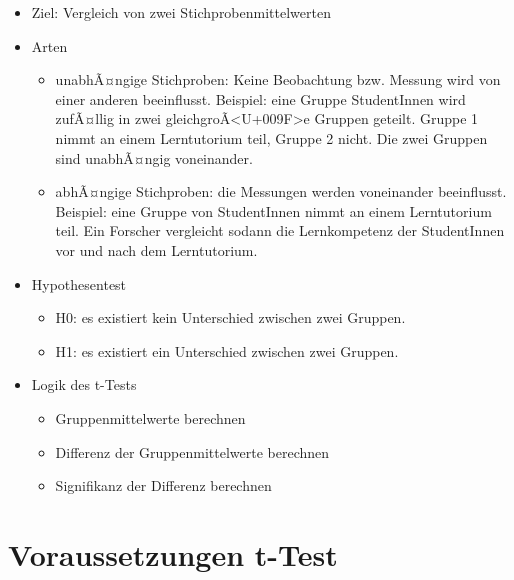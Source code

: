 \documentclass[
]{book}
\providecommand{\tightlist}{%
  \setlength{\itemsep}{0pt}\setlength{\parskip}{0pt}}
\begin{document}
\begin{itemize}
\tightlist
\item
  Ziel: Vergleich von zwei Stichprobenmittelwerten
\item
  Arten

  \begin{itemize}
  \tightlist
  \item
    unabhÃ¤ngige Stichproben: Keine Beobachtung bzw. Messung wird von einer anderen beeinflusst. Beispiel: eine Gruppe StudentInnen wird zufÃ¤llig in zwei gleichgroÃ\textless U+009F\textgreater e Gruppen geteilt. Gruppe 1 nimmt an einem Lerntutorium teil, Gruppe 2 nicht. Die zwei Gruppen sind unabhÃ¤ngig voneinander.
  \item
    abhÃ¤ngige Stichproben: die Messungen werden voneinander beeinflusst. Beispiel: eine Gruppe von StudentInnen nimmt an einem Lerntutorium teil. Ein Forscher vergleicht sodann die Lernkompetenz der StudentInnen vor und nach dem Lerntutorium.
  \end{itemize}
\item
  Hypothesentest

  \begin{itemize}
  \tightlist
  \item
    H0: es existiert kein Unterschied zwischen zwei Gruppen.
  \item
    H1: es existiert ein Unterschied zwischen zwei Gruppen.
  \end{itemize}
\item
  Logik des t-Tests

  \begin{itemize}
  \tightlist
  \item
    Gruppenmittelwerte berechnen
  \item
    Differenz der Gruppenmittelwerte berechnen
  \item
    Signifikanz der Differenz berechnen
  \end{itemize}
\end{itemize}

\hypertarget{voraussetzungen-t-test}{%
\section{Voraussetzungen t-Test}\label{voraussetzungen-t-test}}
\end{document}
